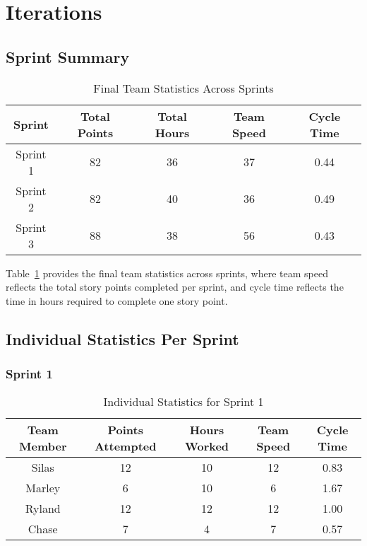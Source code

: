 \clearpage
\section{Iterations}

\subsection{Sprint Summary}
\begin{table}[H]
    \centering
    \begin{tabular}{|c|c|c|c|c|}
    \hline
    \textbf{Sprint} & \textbf{Total Points} & \textbf{Total Hours} & \textbf{Team Speed} & \textbf{Cycle Time} \\ \hline
    Sprint 1 & 82 & 36 & 37 & 0.44 \\ \hline
    Sprint 2 & 82 & 40 & 36 & 0.49 \\ \hline
    Sprint 3 & 88 & 38 & 56 & 0.43 \\ \hline
    \end{tabular}
    \caption{Final Team Statistics Across Sprints}
    \label{tab:final_team_stats}
\end{table}

Table~\ref{tab:final_team_stats} provides the final team statistics across sprints, where team speed reflects the total story points completed per sprint, and cycle time reflects the time in hours required to complete one story point.


\subsection{Individual Statistics Per Sprint}

\subsubsection{Sprint 1}
\begin{table}[H]
    \centering
    \begin{tabular}{|c|c|c|c|c|}
    \hline
    \textbf{Team Member} & \textbf{Points Attempted} & \textbf{Hours Worked} & \textbf{Team Speed} & \textbf{Cycle Time} \\ \hline
    Silas & 12 & 10 & 12 & 0.83 \\ \hline
    Marley & 6 & 10 & 6 & 1.67 \\ \hline
    Ryland & 12 & 12 & 12 & 1.00 \\ \hline
    Chase & 7 & 4 & 7 & 0.57 \\ \hline
    \end{tabular}
    \caption{Individual Statistics for Sprint 1}
    \label{tab:individual_sprint1}
\end{table}

